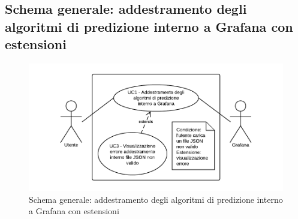 \subsection{Schema generale: addestramento degli algoritmi di predizione interno a Grafana con estensioni}
\begin{figure}[H]
\includegraphics{img/UC1 - Schema generale.png}
\caption{Schema generale: addestramento degli algoritmi di predizione interno a Grafana con estensioni}
\end{figure}
